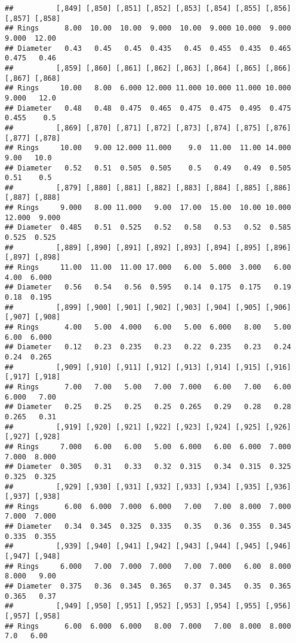 \documentclass[
]{article}
\begin{document}
\begin{verbatim}
##          [,849] [,850] [,851] [,852] [,853] [,854] [,855] [,856] [,857] [,858]
## Rings      8.00  10.00  10.00  9.000  10.00  9.000 10.000  9.000  9.000  12.00
## Diameter   0.43   0.45   0.45  0.435   0.45  0.455  0.435  0.465  0.475   0.46
##          [,859] [,860] [,861] [,862] [,863] [,864] [,865] [,866] [,867] [,868]
## Rings     10.00   8.00  6.000 12.000 11.000 10.000 11.000 10.000  9.000   12.0
## Diameter   0.48   0.48  0.475  0.465  0.475  0.475  0.495  0.475  0.455    0.5
##          [,869] [,870] [,871] [,872] [,873] [,874] [,875] [,876] [,877] [,878]
## Rings     10.00   9.00 12.000 11.000    9.0  11.00  11.00 14.000   9.00   10.0
## Diameter   0.52   0.51  0.505  0.505    0.5   0.49   0.49  0.505   0.51    0.5
##          [,879] [,880] [,881] [,882] [,883] [,884] [,885] [,886] [,887] [,888]
## Rings     9.000   8.00 11.000   9.00  17.00  15.00  10.00 10.000 12.000  9.000
## Diameter  0.485   0.51  0.525   0.52   0.58   0.53   0.52  0.585  0.525  0.525
##          [,889] [,890] [,891] [,892] [,893] [,894] [,895] [,896] [,897] [,898]
## Rings     11.00  11.00  11.00 17.000   6.00  5.000  3.000   6.00   4.00  6.000
## Diameter   0.56   0.54   0.56  0.595   0.14  0.175  0.175   0.19   0.18  0.195
##          [,899] [,900] [,901] [,902] [,903] [,904] [,905] [,906] [,907] [,908]
## Rings      4.00   5.00  4.000   6.00   5.00  6.000   8.00   5.00   6.00  6.000
## Diameter   0.12   0.23  0.235   0.23   0.22  0.235   0.23   0.24   0.24  0.265
##          [,909] [,910] [,911] [,912] [,913] [,914] [,915] [,916] [,917] [,918]
## Rings      7.00   7.00   5.00   7.00  7.000   6.00   7.00   6.00  6.000   7.00
## Diameter   0.25   0.25   0.25   0.25  0.265   0.29   0.28   0.28  0.265   0.31
##          [,919] [,920] [,921] [,922] [,923] [,924] [,925] [,926] [,927] [,928]
## Rings     7.000   6.00   6.00   5.00  6.000   6.00  6.000  7.000  7.000  8.000
## Diameter  0.305   0.31   0.33   0.32  0.315   0.34  0.315  0.325  0.325  0.325
##          [,929] [,930] [,931] [,932] [,933] [,934] [,935] [,936] [,937] [,938]
## Rings      6.00  6.000  7.000  6.000   7.00   7.00  8.000  7.000  7.000  7.000
## Diameter   0.34  0.345  0.325  0.335   0.35   0.36  0.355  0.345  0.335  0.355
##          [,939] [,940] [,941] [,942] [,943] [,944] [,945] [,946] [,947] [,948]
## Rings     6.000   7.00  7.000  7.000   7.00  7.000   6.00  8.000  8.000   9.00
## Diameter  0.375   0.36  0.345  0.365   0.37  0.345   0.35  0.365  0.365   0.37
##          [,949] [,950] [,951] [,952] [,953] [,954] [,955] [,956] [,957] [,958]
## Rings      6.00  6.000  6.000   8.00  7.000   7.00  8.000  8.000    7.0   6.00

\end{verbatim}
\end{document}
